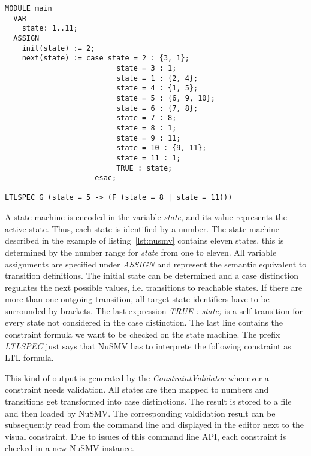 \begin{lstlisting}[float = htbp, captionpos=b, breaklines=true, showspaces=false, showtabs=false, tabsize=2, caption=Example of a NuSMV diagram file., label=lst:nusmv]
MODULE main
  VAR
    state: 1..11;
  ASSIGN
    init(state) := 2;
    next(state) := case state = 2 : {3, 1};
                          state = 3 : 1;
                          state = 1 : {2, 4};
                          state = 4 : {1, 5};
                          state = 5 : {6, 9, 10};
                          state = 6 : {7, 8};
                          state = 7 : 8;
                          state = 8 : 1;
                          state = 9 : 11;
                          state = 10 : {9, 11};
                          state = 11 : 1;
                          TRUE : state;
                     esac;

LTLSPEC G (state = 5 -> (F (state = 8 | state = 11)))
\end{lstlisting}
A state machine is encoded in the variable \emph{state}, and its value represents the active state. Thus, each state is identified by a number. The state machine described in the example of listing~\ref{lst:nusmv} contains eleven states, this is determined by the number range for \emph{state} from one to eleven. All variable assignments are specified under \emph{ASSIGN} and represent the semantic equivalent to transition definitions. The initial state can be determined and a case distinction regulates the next possible values, i.e. transitions to reachable states. If there are more than one outgoing transition, all target state identifiers have to be surrounded by brackets. The last expression \emph{TRUE : state;} is a self transition for every state not considered in the case distinction.
The last line contains the constraint formula we want to be checked on the state machine. The prefix \emph{LTLSPEC} just says that NuSMV has to interprete the following constraint as LTL formula.

This kind of output is generated by the \emph{ConstraintValidator} whenever a constraint needs validation. All states are then mapped to numbers and transitions get transformed into case distinctions. The result is stored to a file and then loaded by NuSMV. The corresponding valdidation result can be subsequently read from the command line and displayed in the editor next to the visual constraint. Due to issues of this command line API, each constraint is checked in a new NuSMV instance.

